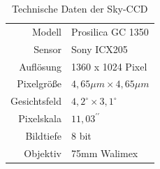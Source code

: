\begin{table}[htbp]
\centering
\begin{tabular}{r|l}
\toprule
Modell & Prosilica GC 1350\\
Sensor & Sony ICX205\\
Auflösung & 1360 x 1024 Pixel \\
Pixelgröße & $4,65\unit{\mu m}\times 4,65\unit{\mu m}$\\
Gesichtsfeld & $4,2^{\circ} \times 3,1^{\circ} $\\
Pixelskala & $11,03^{\prime\prime}$\\
Bildtiefe & 8 bit\\
Objektiv & 75mm Walimex\\
\bottomrule
\end{tabular}
\caption{Technische Daten der Sky-CCD \cite{Prosilica}}
\label{tab:SkyCCD}
\end{table}



